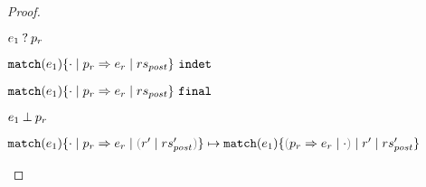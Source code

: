 \begin{proof}
\begin{byCases}
\begin{byCases}
\begin{byCases}
    \item[\text{Scrutinee may matches pattern}]
      \begin{pfsteps*}
      \item $e_1 \mathbin{?} p_r$  
      \item $\mathtt{match}(e_1) \{\cdot \mid p_r \Rightarrow e_r \mid rs_{post}\} ~\mathtt{indet}$  
      \item $\mathtt{match}(e_1) \{\cdot \mid p_r \Rightarrow e_r \mid rs_{post}\} ~\mathtt{final}$ 
      \end{pfsteps*}

    \item[\text{Scrutinee doesn't matche pattern}]
      \begin{pfsteps*}
      \item $e_1 \mathbin{\bot} p_r$  
      \item $\hlongtrans{\hmatch{e_1}{\zruls{\cdot}{\hrul{p_r}{e_r}}{\hrulesP{r'}{rs_{post}'}}}}{\hmatch{e_1}{\zruls{\hrulesP{\hrul{p_r}{e_r}}{\cdot}}{r'}{rs_{post}'}}}$ 
      \end{pfsteps*}
      \end{byCases}
  \end{byCases}
\end{byCases}
\end{proof}
